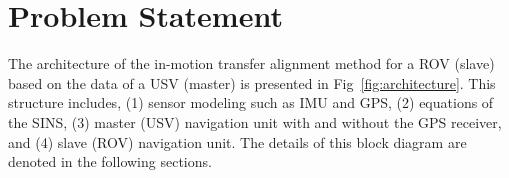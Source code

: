 \documentclass[3p]{elsarticle}
\begin{document}
\section{Problem Statement}\label{sec:problem}
\noindent The architecture of the in-motion transfer alignment method for a ROV (slave) based on the data of a USV (master) is presented in Fig~\ref{fig:architecture}.
This structure includes, (1) sensor modeling such as IMU and GPS, (2) equations of the SINS, (3) master (USV) navigation unit with and without the GPS receiver, and (4) slave (ROV) navigation unit. The details of this block diagram are denoted in the following sections.








\end{document}
